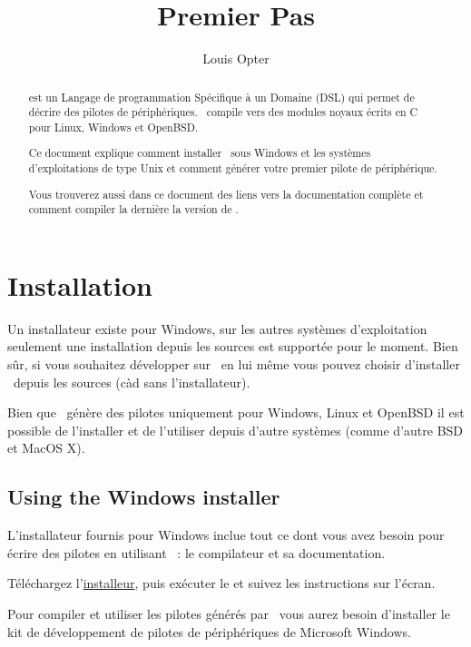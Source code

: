 \documentclass[francais]{rtxarticle}
\title{Premier Pas}
\author{Louis Opter}
\begin{document}
\maketitle

\begin{abstract}
\rtx est un Langage de programmation Spécifique à un Domaine (DSL) qui permet de
décrire des pilotes de périphériques. \rtx\ compile vers des modules noyaux
écrits en C pour Linux, Windows et OpenBSD.

Ce document explique comment installer \rtx\ sous Windows et les systèmes
d'exploitations de type Unix et comment générer votre premier pilote de
périphérique.

Vous trouverez aussi dans ce document des liens vers la documentation complète
et comment compiler la dernière la version de \rtx.
\end{abstract}

\tableofcontents

\section{Installation}

Un installateur existe pour Windows, sur les autres systèmes d'exploitation
seulement une installation depuis les sources est supportée pour le moment.
Bien sûr, si vous souhaitez développer sur \rtx\ en lui même vous pouvez
choisir d'installer \rtx\ depuis les sources (càd sans l'installateur).

Bien que \rtx\ génère des pilotes uniquement pour Windows, Linux et OpenBSD il
est possible de l'installer et de l'utiliser depuis d'autre systèmes (comme
d'autre BSD et MacOS X).

\subsection{Using the Windows installer}

L'installateur fournis pour Windows inclue tout ce dont vous avez besoin pour
écrire des pilotes en utilisant \rtx\ : le compilateur et sa documentation.

Téléchargez l'\href{http://rathaxes.googlecode.com/files/rathaxes-latest.exe}{installeur},
puis exécuter le et suivez les instructions sur l'écran.

Pour compiler et utiliser les pilotes générés par \rtx\ vous aurez besoin
d'installer le kit de développement de pilotes de périphériques de Microsoft
Windows.
\end{document}
